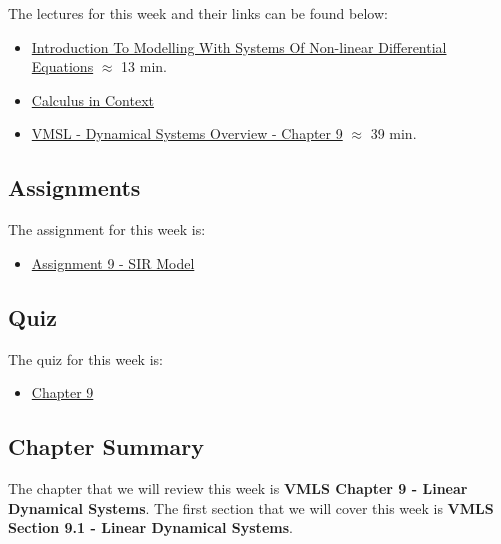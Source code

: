 The lectures for this week and their links can be found below:

\begin{itemize}
    \item \href{https://applied.cs.colorado.edu/mod/hvp/view.php?id=50773}{Introduction To Modelling With Systems Of Non-linear Differential Equations} $\approx$ 13 min.
    \item \href{https://scholarworks.smith.edu/textbooks/2/}{Calculus in Context}
    \item \href{https://www.youtube.com/watch?v=NS0jvPLtgGc}{VMSL - Dynamical Systems Overview - Chapter 9} $\approx$ 39 min.
\end{itemize}

\subsection{Assignments}

The assignment for this week is:

\begin{itemize}
    \item \href{https://github.com/QuantumCompiler/CU/tree/main/CSPB%202820%20-%20Linear%20Algebra%20With%20Computer%20Science%20Applications/Assignments/Assignment%209%20-%20SIR%20Model}{Assignment 9 - SIR Model}
\end{itemize}

\subsection{Quiz}

The quiz for this week is:

\begin{itemize}
    \item \href{https://applied.cs.colorado.edu/mod/quiz/view.php?id=50777}{Chapter 9}
\end{itemize}

\newpage

\subsection{Chapter Summary}

The chapter that we will review this week is \textbf{VMLS Chapter 9 - Linear Dynamical Systems}. The first section that we will cover this week is \textbf{VMLS Section 9.1 - Linear Dynamical Systems}.

